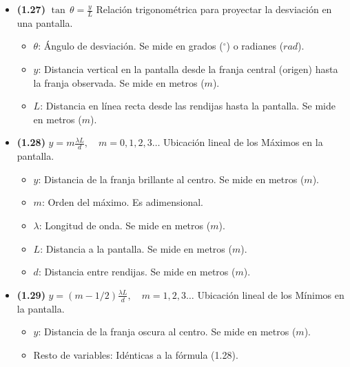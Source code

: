 \documentclass{article}
\begin{document}
\begin{itemize}
				\item \textbf{(1.27)} $\boxed{\tan\,\theta=\frac{y}{L}}$ Relación trigonométrica para proyectar la desviación en una pantalla.
					\begin{itemize}
						\item $\theta$: Ángulo de desviación. Se mide en grados ($^\circ$) o radianes ($rad$).
						\item $y$: Distancia vertical en la pantalla desde la franja central (origen) hasta la franja observada. Se mide en metros ($m$).
						\item $L$: Distancia en línea recta desde las rendijas hasta la pantalla. Se mide en metros ($m$).
					\end{itemize}

				\item \textbf{(1.28)} $\boxed{y=m\frac{\lambda L}{d}, \quad m=0,1,2,3\dots}$ Ubicación lineal de los Máximos en la pantalla.
					\begin{itemize}
						\item $y$: Distancia de la franja brillante al centro. Se mide en metros ($m$).
						\item $m$: Orden del máximo. Es adimensional.
						\item $\lambda$: Longitud de onda. Se mide en metros ($m$).
						\item $L$: Distancia a la pantalla. Se mide en metros ($m$).
						\item $d$: Distancia entre rendijas. Se mide en metros ($m$).
					\end{itemize}

				\item \textbf{(1.29)} $\boxed{y=(m-1/2)\frac{\lambda L}{d}, \quad m=1,2,3\dots}$ Ubicación lineal de los Mínimos en la pantalla.
					\begin{itemize}
						\item $y$: Distancia de la franja oscura al centro. Se mide en metros ($m$).
						\item Resto de variables: Idénticas a la fórmula (1.28).
					\end{itemize}
			\end{itemize}
\end{document}
